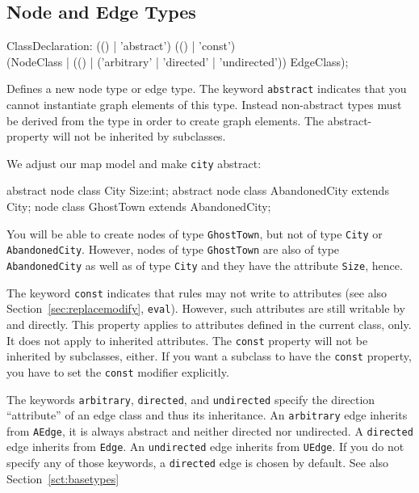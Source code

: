 \subsection{Node and Edge Types}\label{nodeandedgetypes}
\begin{rail}
  ClassDeclaration: (() | 'abstract') (() | 'const') \\
    (NodeClass | (() | ('arbitrary' | 'directed' | 'undirected')) EdgeClass);
\end{rail}
Defines a new node type or edge type.
The keyword \texttt{abstract} indicates that you cannot instantiate graph elements of this type.
Instead non-abstract types must be derived from the type in order to create graph elements.
The abstract-property will not be inherited by subclasses.

\begin{example}
We adjust our map model and make \texttt{city} abstract:
\begin{grgen}
abstract node class City {
  Size:int;
}
abstract node class AbandonedCity extends City;
node class GhostTown extends AbandonedCity;
\end{grgen}
You will be able to create nodes of type \texttt{GhostTown}, but not of type \texttt{City} or \texttt{AbandonedCity}. However, nodes of type \texttt{GhostTown} are also of type \texttt{AbandonedCity} as well as of type \texttt{City} and they have the attribute \texttt{Size}, hence.
\end{example}
The keyword \texttt{const} indicates that rules may not write to attributes (see also Section~\ref{sec:replacemodify}, \texttt{eval}). However, such attributes are still writable by \LibGr{} and \GrShell{} directly. This property applies to attributes defined in the current class, only. It does not apply to inherited attributes. The \texttt{const} property will not be inherited by subclasses, either. If you want a subclass to have the \texttt{const} property, you have to set the \texttt{const} modifier explicitly.

The keywords \texttt{arbitrary}, \texttt{directed}, and \texttt{undirected} specify the direction ``attribute'' of an edge class and thus its inheritance.
An \texttt{arbitrary} edge inherits from \texttt{AEdge}, it is always abstract and neither directed nor undirected.
A \texttt{directed} edge inherits from \texttt{Edge}.
An \texttt{undirected} edge inherits from \texttt{UEdge}.
If you do not specify any of those keywords, a \texttt{directed} edge is chosen by default.
See also Section~\ref{sct:basetypes}

